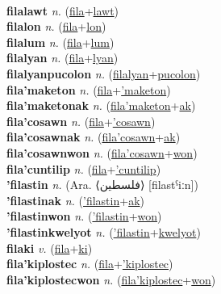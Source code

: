  \label{fila'amelika} \\
\textbf{filalawt} \textit{n.} (\hyperref[fila]{fila}+\hyperref[lawt]{lawt})
 \label{filalawt} \\
\textbf{filalon} \textit{n.} (\hyperref[fila]{fila}+\hyperref[lon]{lon})
 \label{filalon} \\
\textbf{filalum} \textit{n.} (\hyperref[fila]{fila}+\hyperref[lum]{lum})
 \label{filalum} \\
\textbf{filalyan} \textit{n.} (\hyperref[fila]{fila}+\hyperref[lyan]{lyan})
 \label{filalyan} \\
\textbf{filalyanpucolon} \textit{n.} (\hyperref[filalyan]{filalyan}+\hyperref[pucolon]{pucolon})
 \label{filalyanpucolon} \\
\textbf{fila'maketon} \textit{n.} (\hyperref[fila]{fila}+\hyperref['maketon]{'maketon})
 \label{fila'maketon} \\
\textbf{fila'maketonak} \textit{n.} (\hyperref[fila'maketon]{fila'maketon}+\hyperref[ak]{ak})
 \label{fila'maketonak} \\
\textbf{fila'cosawn} \textit{n.} (\hyperref[fila]{fila}+\hyperref['cosawn]{'cosawn})
 \label{fila'cosawn} \\
\textbf{fila'cosawnak} \textit{n.} (\hyperref[fila'cosawn]{fila'cosawn}+\hyperref[ak]{ak})
 \label{fila'cosawnak} \\
\textbf{fila'cosawnwon} \textit{n.} (\hyperref[fila'cosawn]{fila'cosawn}+\hyperref[won]{won})
 \label{fila'cosawnwon} \\
\textbf{fila'cuntilip} \textit{n.} (\hyperref[fila]{fila}+\hyperref['cuntilip]{'cuntilip})
 \label{fila'cuntilip} \\
\textbf{'filastin} \textit{n.} (Ara. ⟨فلسطين⟩ [filastˁiːn])
 \label{'filastin} \\
\textbf{'filastinak} \textit{n.} (\hyperref['filastin]{'filastin}+\hyperref[ak]{ak})
 \label{'filastinak} \\
\textbf{'filastinwon} \textit{n.} (\hyperref['filastin]{'filastin}+\hyperref[won]{won})
 \label{'filastinwon} \\
\textbf{'filastinkwelyot} \textit{n.} (\hyperref['filastin]{'filastin}+\hyperref[kwelyot]{kwelyot})
 \label{'filastinkwelyot} \\
\textbf{filaki} \textit{v.} (\hyperref[fila]{fila}+\hyperref[ki]{ki})
 \label{filaki} \\
\textbf{fila'kiplostec} \textit{n.} (\hyperref[fila]{fila}+\hyperref['kiplostec]{'kiplostec})
 \label{fila'kiplostec} \\
\textbf{fila'kiplostecwon} \textit{n.} (\hyperref[fila'kiplostec]{fila'kiplostec}+\hyperref[won]{won})
